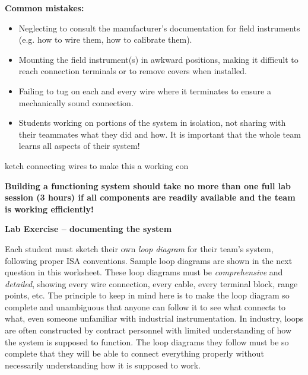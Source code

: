 \documentclass[12pt,a4paper]{article}
\begin{document}
\begin{itemize}
\vskip 10pt

{\bf Common mistakes:}

\begin{itemize}
\item{} Neglecting to consult the manufacturer's documentation for field instruments (e.g. how to wire them, how to calibrate them).
\item{} Mounting the field instrument(s) in awkward positions, making it difficult to reach connection terminals or to remove covers when installed.
\item{} Failing to tug on each and every wire where it terminates to ensure a mechanically sound connection.
\item{} Students working on portions of the system in isolation, not sharing with their teammates what they did and how.  It is important that the whole team learns all aspects of their system!
\end{itemize}

ketch connecting wires to make this a working con

{\bf Building a functioning system should take no more than one full lab session (3 hours) if all components are readily available and the team is working efficiently!}




\vfil \eject

\noindent
{\bf Lab Exercise -- documenting the system}

\vskip 5pt

Each student must sketch their own {\it loop diagram} for their team's system, following proper ISA conventions.  Sample loop diagrams are shown in the next question in this worksheet.  These loop diagrams must be {\it comprehensive} and {\it detailed}, showing every wire connection, every cable, every terminal block, range points, etc.  The principle to keep in mind here is to make the loop diagram so complete and unambiguous that anyone can follow it to see what connects to what, even someone unfamiliar with industrial instrumentation.  In industry, loops are often constructed by contract personnel with limited understanding of how the system is supposed to function.  The loop diagrams they follow must be so complete that they will be able to connect everything properly without necessarily understanding how it is supposed to work.


\end{itemize}
\end{document}

